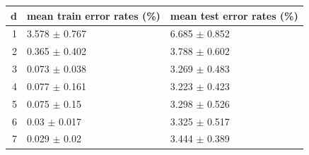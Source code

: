 \begin{tabular}{rll}
\toprule
d & mean train error rates (\%) & mean test error rates (\%) \\
\midrule
1 & 3.578 $\pm$ 0.767 & 6.685 $\pm$ 0.852 \\
2 & 0.365 $\pm$ 0.402 & 3.788 $\pm$ 0.602 \\
3 & 0.073 $\pm$ 0.038 & 3.269 $\pm$ 0.483 \\
4 & 0.077 $\pm$ 0.161 & 3.223 $\pm$ 0.423 \\
5 & 0.075 $\pm$ 0.15 & 3.298 $\pm$ 0.526 \\
6 & 0.03 $\pm$ 0.017 & 3.325 $\pm$ 0.517 \\
7 & 0.029 $\pm$ 0.02 & 3.444 $\pm$ 0.389 \\
\bottomrule
\end{tabular}

